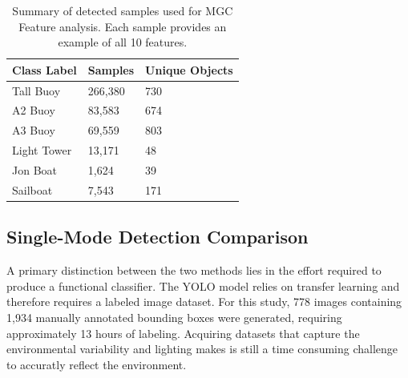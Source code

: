 \documentclass{erauthesis}
\begin{document}

\begin{table}[htbp]
\centering
\begin{tabular}{lll}
\hline
Class Label & Samples & Unique Objects \\
\hline
\hline
Tall Buoy   & 266,380     & 730           \\
A2 Buoy     & 83,583      & 674           \\
A3 Buoy     & 69,559      & 803           \\
Light Tower & 13,171      & 48            \\
Jon Boat    & 1,624       & 39            \\
Sailboat    & 7,543       & 171           \\      
\hline
\end{tabular}
\caption{Summary of detected samples used for MGC Feature analysis. Each sample provides an example of all 10 features.}
\label{tbl:class_distribution}
\end{table}

\subsection{Single-Mode Detection Comparison} \label{yolo_gbcache_compare}

A primary distinction between the two methods lies in the effort required to produce a functional classifier. 
The YOLO model relies on transfer learning and therefore requires a labeled image dataset.
For this study, 778 images containing 1,934 manually annotated bounding boxes were generated, requiring approximately 13 hours of labeling. 
Acquiring datasets that capture the environmental variability and lighting makes is still a time consuming challenge to accuratly reflect the environment.
\end{document}
